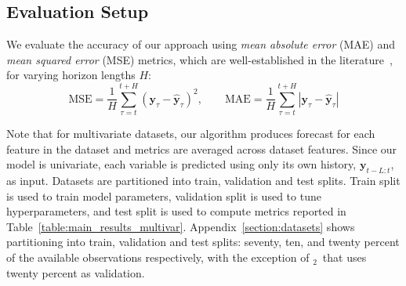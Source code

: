 \subsection{Evaluation Setup}
We evaluate the accuracy of our approach using \emph{mean absolute error} (MAE) and \emph{mean squared error} (MSE) metrics, which are well-established in the literature~\citep{zhou2021informer,wu2021autoformer}, for varying horizon lengths $H$:
\begin{equation}
    \mathrm{MSE} = \frac{1}{H} \sum^{t+H}_{\tau=t}\left(\mathbf{y}_{\tau}-\hat{\mathbf{y}}_{\tau}\right)^{2},\qquad \mathrm{MAE} = \frac{1}{H} \sum^{t+H}_{\tau=t} |\mathbf{y}_{\tau}-\hat{\mathbf{y}}_{\tau}| %
\end{equation}

Note that for multivariate datasets, our algorithm produces forecast for each feature in the dataset and metrics are averaged across dataset features. Since our model is univariate, each variable is predicted using only its own history, $\mathbf{y}_{t-L:t}$, as input. Datasets are partitioned into train, validation and test splits. Train split is used to train model parameters, validation split is used to tune hyperparameters, and test split is used to compute metrics reported in Table~\ref{table:main_results_multivar}. Appendix~\ref{section:datasets} shows partitioning into train, validation and test splits: seventy, ten, and twenty percent of the available observations respectively, with the exception of \ETTm$_2$\ that uses twenty percent as validation.



